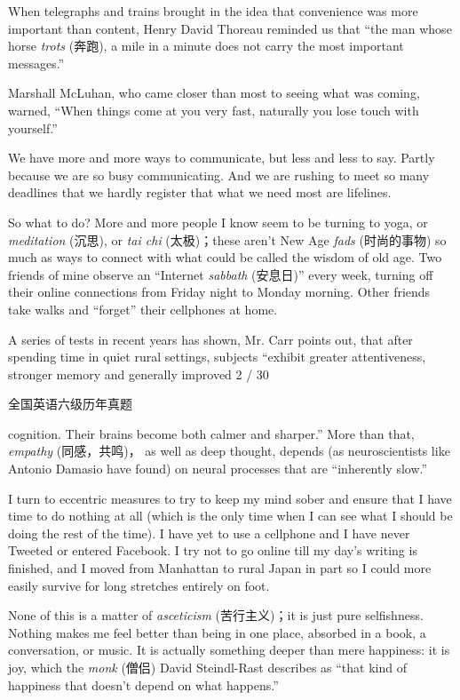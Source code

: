 \documentclass[UTF8,11pt]{ctexart}
\begin{document}
When telegraphs and trains brought in the idea that convenience was more important than content, Henry David Thoreau reminded us that “the man whose horse\textit{ trots} (奔跑), a mile in a minute does not carry the most important messages.”


Marshall McLuhan, who came closer than most to seeing what was coming, warned, “When things come at you very fast, naturally you lose touch with yourself.”


We have more and more ways to communicate, but less and less to say. Partly because we are so busy communicating. And we are rushing to meet so many deadlines that we hardly register that what we need most are lifelines.


So what to do? More and more people I know seem to be turning to yoga, or\textit{ meditation} (沉思), or\textit{ tai chi} (太极)；these aren’t New Age\textit{ fads} (时尚的事物) so much as ways to connect with what could be called the wisdom of old age. Two friends of mine observe an “Internet\textit{ sabbath} (安息日)” every week, turning off their online connections from Friday night to Monday morning. Other friends take walks and “forget” their cellphones at home.


A series of tests in recent years has shown, Mr. Carr points out, that after spending time in quiet rural settings, subjects “exhibit greater attentiveness, stronger memory and generally improved 2 / 30


全国英语六级历年真题


cognition. Their brains become both calmer and sharper.” More than that,\textit{ empathy} (同感，共鸣)， as well as deep thought, depends (as neuroscientists like Antonio Damasio have found) on neural processes that are “inherently slow.”


I turn to eccentric measures to try to keep my mind sober and ensure that I have time to do nothing at all (which is the only time when I can see what I should be doing the rest of the time). I have yet to use a cellphone and I have never Tweeted or entered Facebook. I try not to go online till my day’s writing is finished, and I moved from Manhattan to rural Japan in part so I could more easily survive for long stretches entirely on foot.


None of this is a matter of\textit{ asceticism} (苦行主义)；it is just pure selfishness. Nothing makes me feel better than being in one place, absorbed in a book, a conversation, or music. It is actually something deeper than mere happiness: it is joy, which the\textit{ monk} (僧侣) David Steindl-Rast describes as “that kind of happiness that doesn’t depend on what happens.”
\end{document}
